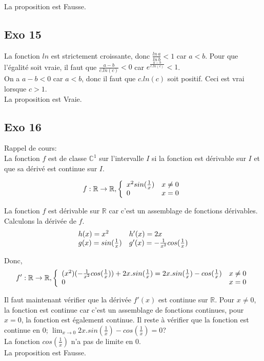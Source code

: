 \documentclass[]{book}
\theoremstyle{definition}
\newcommand{\bb}[1]{\mathbb{#1}}
\newcommand{\R}{\bb{R}}
\newcommand{\C}{\bb{C}}
\begin{document}
La proposition est Fausse.


\subsection*{Exo 15}
La fonction $ln$ est strictement croissante, donc $\frac{ln\,a}{ln\,b} < 1$ car $a<b$. Pour que l'\'egalit\'e soit vraie, il faut que $\frac{a-b}{c.ln(c)} < 0$ car $e^{\frac{a-b}{c.ln(c)}} < 1$.\\
On a $a-b < 0$ car $a<b$, donc il faut que $c.ln(c)$ soit positif. Ceci est vrai lorsque $c > 1$.\\


La proposition est Vraie.


\subsection*{Exo 16}
Rappel de cours:\\
La fonction $f$ est de classe $\C^1$ sur l'intervalle $I$ si la fonction est d\'erivable sur $I$ et que sa d\'eriv\'e est continue sur $I$.

$$f: \R \to \R,
\left\{ 
\begin{array}{l l}
 x^2sin(\frac{1}{x}) & x \neq 0\\
 0 & x = 0\\
\end{array}
\right. 
$$

La fonction $f$ est d\'erivable sur $\R$ car c'est un assemblage de fonctions d\'erivables. Calculons la d\'eriv\'ee de $f$.
$$
\begin{array}{l l}
 h(x) = x^2 & h'(x)= 2x\\
 g(x) = sin(\frac{1}{x}) & g'(x)= -\frac{1}{x^2}cos(\frac{1}{x})\\
\end{array}
$$

Donc,
$$f': \R \to \R,
\left\{ 
\begin{array}{l l}
 (x^2)(-\frac{1}{x^2}cos(\frac{1}{x})) + 2x.sin(\frac{1}{x}) = 2x.sin(\frac{1}{x}) - cos(\frac{1}{x})& x \neq 0\\
 0 & x = 0\\
\end{array}
\right. 
$$

Il faut maintenant v\'erifier que la d\'eriv\'ee $f'(x)$ est continue sur $\R$. Pour $x \neq 0$, la fonction est continue car c'est un assemblage de fonctions continues, pour $x=0$, la fonction est \'egalement continue. Il reste \`a v\'erifier que la fonction est continue en $0$; $\lim_{x \to 0} 2x.sin(\frac{1}{x}) - cos(\frac{1}{x}) = 0$?\\

La fonction $cos(\frac{1}{x})$ n'a pas de limite en $0$.\\

La proposition est Fausse.
\end{document}
